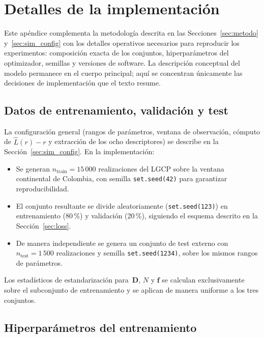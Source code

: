 \documentclass[a4paper,fleqn]{cas-sc}
\numberwithin{equation}{section}
\begin{document}
\appendix

\section{Detalles de la implementaci\'on}
\label{app:detalles}

Este ap\'endice complementa la metodolog\'ia descrita en las
Secciones~\ref{sec:metodo} y~\ref{sec:sim_config} con los detalles
operativos necesarios para reproducir los experimentos: composici\'on
exacta de los conjuntos, hiperpar\'ametros del optimizador, semillas y
versiones de software. La descripci\'on conceptual del modelo permanece
en el cuerpo principal; aqu\'i se concentran \'unicamente las decisiones
de implementaci\'on que el texto resume.

\subsection{Datos de entrenamiento, validaci\'on y test}
\label{app:trainingdata}

La configuraci\'on general (rangos de par\'ametros, ventana de
observaci\'on, c\'omputo de $\hat{L}(r)-r$ y extracci\'on de los ocho
descriptores) se describe en la Secci\'on~\ref{sec:sim_config}. En la
implementaci\'on:
\begin{itemize}
    \item Se generan $n_{\mathrm{train}}=15\,000$ realizaciones del LGCP
    sobre la ventana continental de Colombia, con semilla
    \texttt{set.seed(42)} para garantizar reproducibilidad.
    \item El conjunto resultante se divide aleatoriamente
    (\texttt{set.seed(123)}) en entrenamiento (80\,\%) y validaci\'on
    (20\,\%), siguiendo el esquema descrito en la
    Secci\'on~\ref{sec:loss}.
    \item De manera independiente se genera un conjunto de test externo
    con $n_{\mathrm{test}}=1\,500$ realizaciones y semilla
    \texttt{set.seed(1234)}, sobre los mismos rangos de par\'ametros.
\end{itemize}
Los estad\'isticos de estandarizaci\'on para~$\mathbf{D}$, $N$ y
$\mathbf{f}$ se calculan exclusivamente sobre el subconjunto de
entrenamiento y se aplican de manera uniforme a los tres conjuntos.

\subsection{Hiperpar\'ametros del entrenamiento}
\label{app:training}
\end{document}
